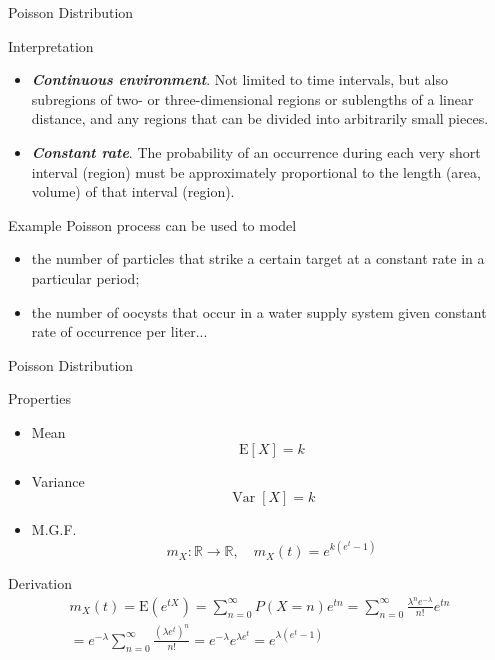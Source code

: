 \documentclass{beamer}
\newcommand{\bb}[1]{\textcolor{antiquefuchsia}{\textbf{\textit{#1}}}}
\begin{document}
\begin{frame}{Poisson Distribution}
\begin{block}{Interpretation}
\begin{itemize}
\item \bb{Continuous environment}. Not limited to time intervals, but also subregions of two- or three-dimensional regions or sublengths of a linear distance, and any regions that can be divided into arbitrarily small pieces.
\item \bb{Constant rate}. The probability of an occurrence during each very short interval (region) must be approximately proportional to the length (area, volume) of that interval (region).
\end{itemize}
\end{block}
\begin{block}{Example}
Poisson process can be used to model
\begin{itemize}
\item the number of particles that strike a certain target at a constant rate in a particular period;
\item the number of oocysts that occur in a water supply system given constant rate of occurrence per liter...
\end{itemize}
\end{block}
\end{frame}

\begin{frame}{Poisson Distribution}
\begin{block}{Properties}
\begin{itemize}
\item Mean
$$
\mathrm{E}[X]=k
$$
\item Variance
$$
\operatorname{Var}[X]=k
$$
\item M.G.F.
$$
m_{X}: \mathbb{R} \rightarrow \mathbb{R}, \quad m_{X}(t)=e^{k\left(e^{t}-1\right)}
$$
\end{itemize}
\end{block}
\begin{block}{Derivation}
\begin{align*}
m_{X}(t)=\mathrm{E}\left(e^{t X}\right)=\sum_{n=0}^{\infty} P(X=n) e^{t n}
=\sum_{n=0}^{\infty} \frac{\lambda^{n} e^{-\lambda}}{n !} e^{t n}\\ 
=e^{-\lambda} \sum_{n=0}^{\infty} \frac{\left(\lambda e^{t}\right)^{n}}{n !} 
=e^{-\lambda} e^{\lambda e^{t}} 
=e^{\lambda\left(e^{t}-1\right)}
\end{align*}
\end{block}
\end{frame}
\end{document}
